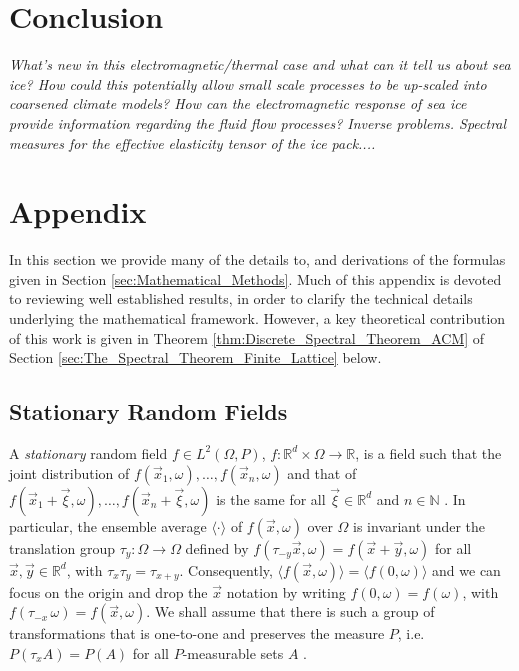 \documentclass{cmslatex}
\renewcommand{\theequation}{\arabic{section}.\arabic{equation}}
\begin{document}
\section{Conclusion}
{\it What's new in this electromagnetic/thermal case and what can it tell us about sea ice? How could this potentially allow small scale processes to be up-scaled into coarsened climate models? How can the electromagnetic response of sea ice provide information regarding the fluid flow processes? Inverse problems. Spectral measures for the effective elasticity tensor of the ice pack....}

\newpage

  \setcounter{equation}{1}  %
  \setcounter{section}{0}  %
  \renewcommand{\theequation}{A-\arabic{equation}}
\renewcommand{\thesection}{A-\arabic{section}}
\section{Appendix} \label{sec:Appendix}


%
 
%
In this section we provide many of the details to, and derivations of
the formulas given in Section \ref{sec:Mathematical_Methods}. Much of this
appendix is devoted to reviewing well established results, in order to
clarify the technical details underlying the mathematical
framework. However, a key theoretical contribution of this work is
given in Theorem \ref{thm:Discrete_Spectral_Theorem_ACM} of Section
\ref{sec:The_Spectral_Theorem_Finite_Lattice} below.   

\subsection{Stationary Random Fields}\label{sec:Stationarity}
%
A \emph{stationary} random field $f\in L^2(\Omega,P)$,
$f:\mathbb{R}^d\times\Omega\to\mathbb{R}$, is a field such that the 
joint distribution of $f(\vec{x}_1,\omega),\ldots,f(\vec{x}_n,\omega)$ and that of
$f(\vec{x}_1+\vec{\xi},\omega),\ldots,f(\vec{x}_n+\vec{\xi},\omega)$ is the same for all
$\vec{\xi}\in\mathbb{R}^d$ and $n\in\mathbb{N}$ \cite{Golden:CMP-473}. In
particular, the ensemble average $\langle\cdot\rangle$ of $f(\vec{x},\omega)$ over $\Omega$ is
invariant under the translation group $\tau_y:\Omega\to\Omega$ defined by
$f(\tau_{-y}\vec{x},\omega)=f(\vec{x}+\vec{y},\omega)$ for all
$\vec{x},\vec{y}\in\mathbb{R}^d$, with $\tau_x\tau_y=\tau_{x+y}$. Consequently, 
$\langle f(\vec{x},\omega)\rangle=\langle f(0,\omega)\rangle$ and we can focus on the origin and drop the
$\vec{x}$ notation by writing $f(0,\omega)=f(\omega)$, with
$f(\tau_{-x}\,\omega)=f(\vec{x},\omega)$. We shall assume that there is such a group
of transformations that is one-to-one and preserves the measure $P$,
i.e. $P(\tau_xA)=P(A)$ for all $P$-measurable sets $A$
\cite{Golden:CMP-473,Papanicolaou:RF-835}.
\end{document}
